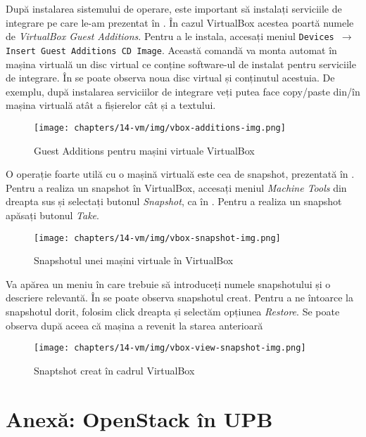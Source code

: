 După instalarea sistemului de operare, este important să instalați serviciile de
integrare pe care le-am prezentat în .
În cazul VirtualBox acestea poartă numele de \textit{VirtualBox Guest Additions}. Pentru a le instala, accesați meniul \texttt{Devices $\rightarrow$ Insert Guest
Additions CD Image}. Această comandă va monta automat în mașina virtuală un disc
virtual ce conține software-ul de instalat pentru serviciile de integrare. În
 se poate observa noua disc virtual
și conținutul acestuia. De exemplu, după instalarea serviciilor de integrare
veți putea face copy/paste din/în mașina virtuală atât a fișierelor cât și a
textului.

\begin{figure}[!htbp]
	\centering
	\texttt{[image: chapters/14-vm/img/vbox-additions-img.png]}
	\caption{Guest Additions pentru mașini virtuale VirtualBox}
	\label{fig:vm:vbox-additions}
\end{figure}

O operație foarte utilă cu o mașină virtuală este cea de snapshot, prezentată
în . Pentru a realiza un snapshot în
VirtualBox, accesați meniul \textit{Machine Tools} din dreapta sus și
selectați butonul \textit{Snapshot}, ca în
. Pentru a realiza un snapshot
apăsați butonul \textit{Take}.

\begin{figure}[!htbp]
	\centering
	\texttt{[image: chapters/14-vm/img/vbox-snapshot-img.png]}
	\caption{Snapshotul unei mașini virtuale în VirtualBox}
	\label{fig:vm:vbox-snapshot}
\end{figure}

Va apărea un meniu în care trebuie să introduceți numele snapshotului și o
descriere relevantă. În  se
poate observa snapshotul creat. Pentru a ne întoarce la snapshotul dorit,
folosim click dreapta și selectăm opțiunea \textit{Restore}.
Se poate observa după aceea că mașina a revenit la starea anterioară

\begin{figure}[!htbp]
	\centering
	\texttt{[image: chapters/14-vm/img/vbox-view-snapshot-img.png]}
	\caption{Snaptshot creat în cadrul VirtualBox}
	\label{fig:vm:vbox-view-snapshot}
\end{figure}

\section{Anexă: OpenStack în UPB}
\label{sec:vm:upb-openstack}

